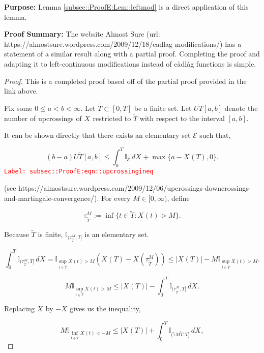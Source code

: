 \documentclass[12pt]{article}
\newcommand{\mb}{\mathbb}
\newcommand{\mc}{\mathcal}
\newcommand{\tr}{\textcolor{red}}
\newcommand{\labe}[1]{\tr{\texttt{Label: #1}}}
\newcommand{\purpose}{\textbf{Purpose: }}
\newcommand{\pfsum}{\textbf{Proof Summary: }}
\newcommand{\ind}{\hspace{24pt}}
\newcommand{\T}{T}								%
\renewcommand{\t}{t}							%
\newcommand{\X}{X}								%
\newcommand{\cind}[1]{_{#1}}					%
\newcommand{\tp}[1]{(#1)}						%
\newcommand{\tip}[1]{#1}						%
\newcommand{\alt}[1]{\widetilde{#1}}			%
\newcommand{\rt}{\tau}							%
\newcommand{\evnt}{\mc{E}}						%
\newcommand{\Tset}{\alt{T}}						%
\newcommand{\upcrs}{U}							%
\newcommand{\gid}[1]{^{#1}}						%
\newcommand{\gidd}[1]{_{#1}}					%
\begin{document}
\purpose Lemma \ref{subsec::ProofE:Lem::leftmod} is a direct application of this lemma.

\pfsum The website Almost Sure (url: https://almostsure.wordpress.com/2009/12/18/cadlag-modifications/) has a statement of a similar result along with a partial proof. Completing the proof and adapting it to left-continuous modifications instead of c\`adl\`ag functions is simple.

\begin{proof}
This is a completed proof based off of the partial proof provided in the link above.

\ind Fix some \(0\leq a < b < \infty\). Let \(\Tset \subset [0,\T]\) be a finite set. Let \(\upcrs{\alt{\T}}[a,b]\) denote the number of upcrossings of \(\X\cind{}\tip{}\) restricted to \(\alt{\T}\) with respect to the interval \([a,b]\).

\ind It can be shown directly that there exists an elementary set \(\evnt\) such that,

\begin{equation}
(b-a)\upcrs{\Tset}[a,b] \leq \int_0^\T \mb{I}_{\evnt}\,d\X\cind{}\tip{} + \max\{a - \X\cind{}\tp{\T},0\}.
\label{subsec::ProofE:eqn::upcrossingineq}
\end{equation}
\labe{subsec::ProofE:eqn::upcrossingineq}

(see https://almostsure.wordpress.com/2009/12/06/upcrossings-downcrossings-and-martingale-convergence/). For every \(M \in [0,\infty)\), define

\[\rt\gid{M}\gidd{\Tset} := \inf\{\t\in \alt{\T}: \X\cind{}\tp{\t} > M\}.\]

Because \(\Tset\) is finite, \(\mb{I}_{(\rt\gid{M}\gidd{\Tset},\T]}\) is an elementary set.

\[\int_0^\T \mb{I}_{(\rt\gid{M}\gidd{\Tset},\T]}\,d\X\cind{}\tip{} = \mb{I}_{\sup_{\t\in \Tset} \X\cind{}\tp{\t} > M}(\X\cind{}\tp{\T} - \X\cind{}\tp{\rt\gid{M}\gidd{\Tset}}) \leq |\X\cind{}\tp{\T}| - M\mb{I}_{\sup_{\t \in \Tset} \X\cind{}\tp{\t} > M}.\]

\[M\mb{I}_{\sup_{\t\in\Tset} \X\cind{}\tp{\t} > M} \leq |\X\cind{}\tp{\T}| - \int_0^T \mb{I}_{(\rt\gid{M}\gidd{\Tset},\T]}\,d\X\cind{}\tip{}.\]


Replacing \(\X\cind{}\tip{}\) by \(-\X\cind{}\tip{}\) gives us the inequality,

\[M\mb{I}_{\inf_{\t\in\Tset} \X\cind{}\tp{\t} < -M} \leq |\X\cind{}\tp{\T}| + \int_0^T \mb{I}_{(\alt{\rt}{M}{\Tset},\T]}\,d\X\cind{}\tip{},\]


\end{proof}
\end{document}
